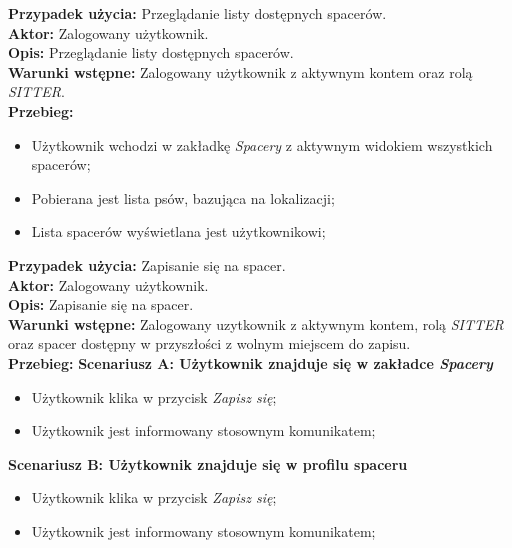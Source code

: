 \noindent
\textbf{Przypadek użycia:} Przeglądanie listy dostępnych spacerów. \\
\textbf{Aktor:} Zalogowany użytkownik. \\
\textbf{Opis:}  Przeglądanie listy dostępnych spacerów. \\
\textbf{Warunki wstępne:} Zalogowany użytkownik z aktywnym kontem oraz rolą \textit{SITTER}. \\
\textbf{Przebieg:}
\begin{itemize}
    \item Użytkownik wchodzi w zakładkę \textit{Spacery} z aktywnym widokiem wszystkich spacerów;
    \item Pobierana jest lista psów, bazująca na lokalizacji;
    \item Lista spacerów wyświetlana jest użytkownikowi;
\end{itemize}

\noindent
\textbf{Przypadek użycia:} Zapisanie się na spacer. \\
\textbf{Aktor:} Zalogowany użytkownik. \\
\textbf{Opis:} Zapisanie się na spacer. \\
\textbf{Warunki wstępne:} Zalogowany uzytkownik z aktywnym kontem, rolą \textit{SITTER} oraz spacer dostępny w przyszłości z wolnym miejscem do zapisu. \\
\textbf{Przebieg:}
\textbf{Scenariusz A: Użytkownik znajduje się w zakładce \textit{Spacery}}
\begin{itemize}
    \item Użytkownik klika w przycisk \textit{Zapisz się};
    \item Użytkownik jest informowany stosownym komunikatem;
\end{itemize}
\textbf{Scenariusz B: Użytkownik znajduje się w profilu spaceru}
\begin{itemize}
    \item Użytkownik klika w przycisk \textit{Zapisz się};
    \item Użytkownik jest informowany stosownym komunikatem;
\end{itemize}

